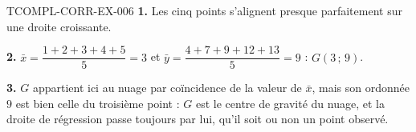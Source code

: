 \begin{corrige}{TCOMPL-CORR-EX-006}
\textbf{1.} Les cinq points s'alignent presque parfaitement sur une droite
croissante.

\textbf{2.} $\bar x=\dfrac{1+2+3+4+5}{5}=3$ et
$\bar y=\dfrac{4+7+9+12+13}{5}=9$ : $G(3\,;\,9)$.

\textbf{3.} $G$ appartient ici au nuage par coïncidence de la valeur de
$\bar x$, mais son ordonnée $9$ est bien celle du troisième point : $G$ est le
centre de gravité du nuage, et la droite de régression passe toujours par lui,
qu'il soit ou non un point observé.
\end{corrige}
